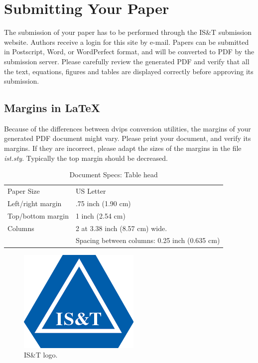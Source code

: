 \documentclass[letterpaper,twocolumn,fleqn]{article}
\begin{document}

\section{Submitting Your Paper}
The submission of your paper has to be performed through the IS\&T
submission website. Authors receive a login for this site by e-mail.
Papers can be submitted in Postscript, Word, or WordPerfect format,
and will be converted to PDF by the submission server. Please
carefully review the generated PDF and verify that all the text,
equations, figures and tables are displayed correctly before approving
its submission.

\subsection{Margins in LaTeX}
Because of the differences between dvips conversion utilities, the
margins of your generated PDF document might vary. Please print
your document, and verify its margins. If they are incorrect, please
adapt the sizes of the margins in the file \emph{ist.sty}. Typically the
top margin should be decreased.

\begin{table}[!h]
\caption{Document Specs: Table head}
\label{tab:specs}
\begin{center}       
\begin{tabular}{p{}p{}} 
Paper Size & US Letter \\
Left/right margin & .75 inch (1.90 cm) \\
Top/bottom margin & 1 inch (2.54 cm) \\
Columns & 2 at 3.38 inch (8.57 cm) wide. \\
 & Spacing between columns: 0.25 inch (0.635 cm)
\end{tabular}
\end{center}
\end{table} 

\begin{figure}[!hb]
  \includegraphics[width=0.3\columnwidth]{logo.png}
  \caption{IS\&T logo.}
  \label{Figure:logo}
\end{figure}
\end{document}
